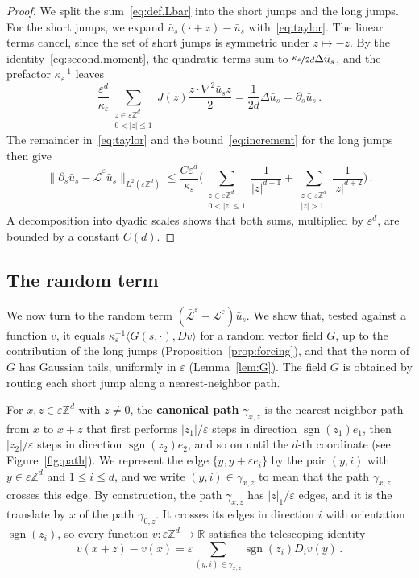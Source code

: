 \documentclass[11pt]{amsart}
\numberwithin{equation}{section}
\newcommand{\Z}{\mathbb{Z}}
\newcommand{\R}{\mathbb{R}}
\newcommand{\eps}{\varepsilon}
\newcommand{\Leps}{\mathcal{L}^\varepsilon}
\newcommand{\Lbar}{\bar{\mathcal{L}}^\varepsilon}
\newcommand{\sgn}{\operatorname{sgn}}
\newcommand{\nf}{\nicefrac}
\begin{document}
\begin{proof}
We split the sum~\eqref{eq:def.Lbar} into the short jumps and the long jumps.
For the short jumps, we expand $\bar u_s(\cdot + z) - \bar u_s$ with~\eqref{eq:taylor}.
The linear terms cancel, since the set of short jumps is symmetric under $z \mapsto -z$.
By the identity~\eqref{eq:second.moment}, the quadratic terms sum to $\nf{\kappa_\eps}{2d} \Delta \bar u_s$, and the prefactor $\kappa_\eps^{-1}$ leaves
\begin{equation*}
    \frac{\eps^d}{\kappa_\eps} \sum_{\substack{z \in \eps \Z^d \\ 0 < |z| \leq 1}} J(z) \frac{z \cdot \nabla^2 \bar u_s z}{2} = \frac{1}{2d} \Delta \bar u_s = \partial_s \bar u_s\,.
\end{equation*}
The remainder in~\eqref{eq:taylor} and the bound~\eqref{eq:increment} for the long jumps then give
\begin{equation*}
    \bigl\| \partial_s \bar u_s - \Lbar \bar u_s \bigr\|_{L^2(\eps \Z^d)} \leq \frac{C \eps^d}{\kappa_\eps} \Biggl( \sum_{\substack{z \in \eps \Z^d \\ 0 < |z| \leq 1}} \frac{1}{|z|^{d-1}} + \sum_{\substack{z \in \eps \Z^d \\ |z| > 1}} \frac{1}{|z|^{d+2}} \Biggr)\,.
\end{equation*}
A decomposition into dyadic scales shows that both sums, multiplied by $\eps^d$, are bounded by a constant $C(d)$.
\end{proof}

\subsection{The random term} \label{sec:forcing}

We now turn to the random term $(\Lbar - \Leps) \bar u_s$.
We show that, tested against a function $v$, it equals $\kappa_\eps^{-1} \langle G(s, \cdot), D v \rangle$ for a random vector field $G$, up to the contribution of the long jumps (Proposition~\ref{prop:forcing}), and that the norm of $G$ has Gaussian tails, uniformly in $\eps$ (Lemma~\ref{lem:G}).
The field $G$ is obtained by routing each short jump along a nearest-neighbor path.

For $x, z \in \eps \Z^d$ with $z \neq 0$, the \textbf{canonical path} $\gamma_{x,z}$ is the nearest-neighbor path from $x$ to $x + z$ that first performs $|z_1|/\eps$ steps in direction $\sgn(z_1) e_1$, then $|z_2|/\eps$ steps in direction $\sgn(z_2) e_2$, and so on until the $d$-th coordinate (see Figure~\ref{fig:path}).
We represent the edge $\{y, y + \eps e_i\}$ by the pair $(y,i)$ with $y \in \eps \Z^d$ and $1 \leq i \leq d$, and we write $(y, i) \in \gamma_{x,z}$ to mean that the path $\gamma_{x,z}$ crosses this edge.
By construction, the path $\gamma_{x,z}$ has $|z|_1/\eps$ edges, and it is the translate by $x$ of the path $\gamma_{0,z}$.
It crosses its edges in direction $i$ with orientation $\sgn(z_i)$, so every function $v \colon \eps \Z^d \to \R$ satisfies the telescoping identity
\begin{equation} \label{eq:telescoping}
    v(x + z) - v(x) = \eps \sum_{(y,i) \in \gamma_{x,z}} \sgn(z_i) D_i v(y)\,.
\end{equation}
\end{document}
